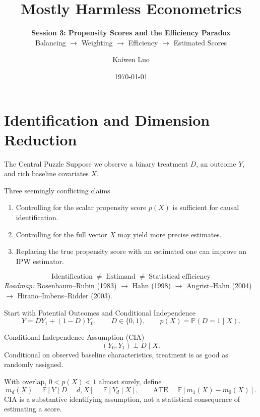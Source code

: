 \documentclass[aspectratio=169,11pt]{beamer}
\title{Mostly Harmless Econometrics}
\subtitle{\textbf{Session 3: Propensity Scores and the Efficiency Paradox}\\[0.55em] Balancing \(\rightarrow\) Weighting \(\rightarrow\) Efficiency \(\rightarrow\) Estimated Scores}
\author{Kaiwen Luo}
\institute{Washington University in St. Louis}
\date{\today}
\newcommand{\E}{\mathbb{E}}
\newcommand{\Pp}{\mathbb{P}}
\newcommand{\ATE}{\mathrm{ATE}}
\begin{document}
\begin{frame}\titlepage\end{frame}

\section{Identification and Dimension Reduction}
\begin{frame}{The Central Puzzle}
\small
Suppose we observe a binary treatment \(D\), an outcome \(Y\), and rich baseline covariates \(X\).
\medskip
\begin{block}{Three seemingly conflicting claims}
\begin{enumerate}
\item Controlling for the \alert{scalar} propensity score \(p(X)\) is sufficient for causal identification.
\item Controlling for the \alert{full vector} \(X\) may yield more precise estimates.
\item Replacing the \alert{true} propensity score with an \alert{estimated} one can improve an IPW estimator.
\end{enumerate}
\end{block}
\medskip
\[
\boxed{\text{Identification} \;\neq\; \text{Estimand} \;\neq\; \text{Statistical efficiency}}
\]
\textit{Roadmap:} Rosenbaum--Rubin (1983) \(\rightarrow\) Hahn (1998) \(\rightarrow\) Angrist--Hahn (2004) \(\rightarrow\) Hirano--Imbens--Ridder (2003).
\end{frame}

\begin{frame}{Start with Potential Outcomes and Conditional Independence}
\small
\[
Y=DY_1+(1-D)Y_0,\qquad D\in\{0,1\}, \qquad p(X)=\Pp(D=1\mid X).
\]
\begin{block}{Conditional Independence Assumption (CIA)}
\[
(Y_0,Y_1)\perp D\mid X.
\]
Conditional on observed baseline characteristics, treatment is as good as randomly assigned.
\end{block}
\medskip
With overlap, \(0<p(X)<1\) almost surely, define
\[
m_d(X)=\E[Y\mid D=d,X]=\E[Y_d\mid X],\qquad
\ATE=\E[m_1(X)-m_0(X)].
\]
\alert{CIA is a substantive identifying assumption, not a statistical consequence of estimating a score.}
\end{frame}
\end{document}
